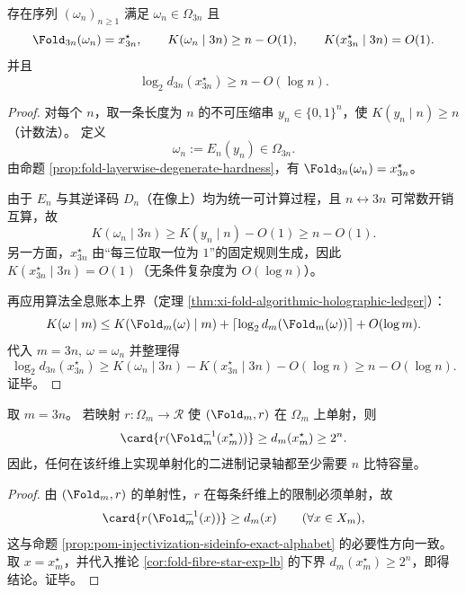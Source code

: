 \begin{theorem}[固定稳定型上的算法信息坍缩尺度]\label{thm:fold-fixed-fiber-kolmogorov-collapse}
存在序列 \((\omega_n)_{n\ge 1}\) 满足 \(\omega_n\in\Omega_{3n}\) 且
\[
\Fold_{3n}(\omega_n)=x^\star_{3n},
\qquad
K(\omega_n\mid 3n)\ge n-O(1),
\qquad
K(x^\star_{3n}\mid 3n)=O(1).
\]
并且
\[
\log_2 d_{3n}(x^\star_{3n})\ge n-O(\log n).
\]
\end{theorem}

\begin{proof}
对每个 \(n\)，取一条长度为 \(n\) 的不可压缩串 \(y_n\in\{0,1\}^n\)，使
\(
K(y_n\mid n)\ge n
\)（计数法）。
定义
\[
\omega_n:=E_n(y_n)\in\Omega_{3n}.
\]
由命题 \ref{prop:fold-layerwise-degenerate-hardness}，有
\(
\Fold_{3n}(\omega_n)=x^\star_{3n}
\)。
\par
由于 \(E_n\) 与其逆译码 \(D_n\)（在像上）均为统一可计算过程，且 \(n\leftrightarrow 3n\) 可常数开销互算，故
\[
K(\omega_n\mid 3n)\ge K(y_n\mid n)-O(1)\ge n-O(1).
\]
另一方面，\(x^\star_{3n}\) 由“每三位取一位为 \(1\)”的固定规则生成，因此
\(
K(x^\star_{3n}\mid 3n)=O(1)
\)（无条件复杂度为 \(O(\log n)\)）。
\par
再应用算法全息账本上界（定理 \ref{thm:xi-fold-algorithmic-holographic-ledger}）：
\[
K(\omega\mid m)\le K(\Fold_m(\omega)\mid m)+\lceil\log_2 d_m(\Fold_m(\omega))\rceil + O(\log m).
\]
代入 \(m=3n,\ \omega=\omega_n\) 并整理得
\[
\log_2 d_{3n}(x^\star_{3n})
\ge
K(\omega_n\mid 3n)-K(x^\star_{3n}\mid 3n)-O(\log n)
\ge
n-O(\log n).
\]
证毕。
\end{proof}

\begin{corollary}[单射化外置账本的线性位数下界]\label{cor:fold-fixed-fiber-external-ledger-linear}
取 \(m=3n\)。
若映射 \(r:\Omega_m\to\mathcal R\) 使 \((\Fold_m,r)\) 在 \(\Omega_m\) 上单射，则
\[
\card{r(\Fold_m^{-1}(x^\star_m))}
\ge
d_m(x^\star_m)
\ge
2^n.
\]
因此，任何在该纤维上实现单射化的二进制记录轴都至少需要 \(n\) 比特容量。
\end{corollary}

\begin{proof}
由 \((\Fold_m,r)\) 的单射性，\(r\) 在每条纤维上的限制必须单射，故
\[
\card{r(\Fold_m^{-1}(x))}\ge d_m(x)\qquad(\forall x\in X_m),
\]
这与命题 \ref{prop:pom-injectivization-sideinfo-exact-alphabet} 的必要性方向一致。
取 \(x=x^\star_m\)，并代入推论 \ref{cor:fold-fibre-star-exp-lb} 的下界 \(d_m(x^\star_m)\ge 2^n\)，即得结论。证毕。
\end{proof}

